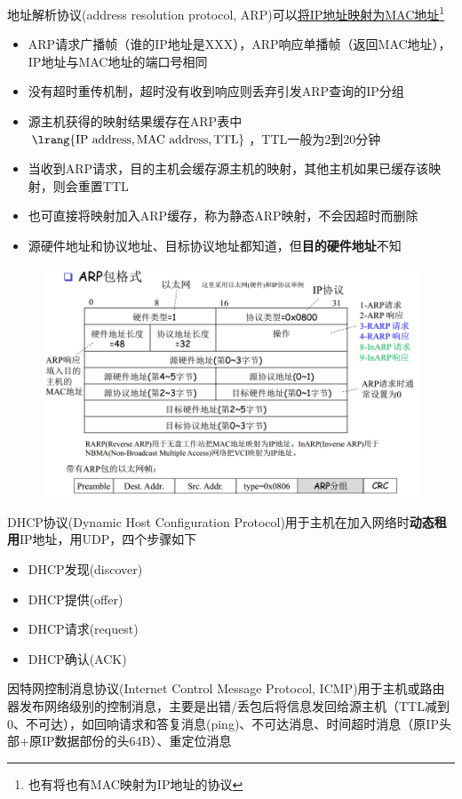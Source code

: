 地址解析协议(address resolution protocol, ARP)可以\underline{将IP地址映射为MAC地址}\footnote{也有将也有MAC映射为IP地址的协议}
\begin{itemize}
	\item ARP请求广播帧（谁的IP地址是XXX），ARP响应单播帧（返回MAC地址），IP地址与MAC地址的端口号相同
	\item 没有超时重传机制，超时没有收到响应则丢弃引发ARP查询的IP分组
	\item 源主机获得的映射结果缓存在ARP表中$\lrang{\text{IP address},\text{MAC address},\text{TTL}}$，TTL一般为2到20分钟
	\item 当收到ARP请求，目的主机会缓存源主机的映射，其他主机如果已缓存该映射，则会重置TTL
	\item 也可直接将映射加入ARP缓存，称为静态ARP映射，不会因超时而删除
	\item 源硬件地址和协议地址、目标协议地址都知道，但\textbf{目的硬件地址}不知
\end{itemize}
\begin{figure}[H]
	\centering
	\includegraphics[width=0.7\linewidth]{fig/ARP.PNG}
\end{figure}

DHCP协议(Dynamic Host Configuration Protocol)用于主机在加入网络时\textbf{动态租用}IP地址，用UDP，四个步骤如下
\begin{itemize}
	\item DHCP发现(discover)
	\item DHCP提供(offer)
	\item DHCP请求(request)
	\item DHCP确认(ACK)
\end{itemize}

因特网控制消息协议(Internet Control Message Protocol, ICMP)用于主机或路由器发布网络级别的控制消息，主要是出错/丢包后将信息发回给源主机（TTL减到0、不可达），如回响请求和答复消息(ping)、不可达消息、时间超时消息（原IP头部+原IP数据部份的头64B）、重定位消息


